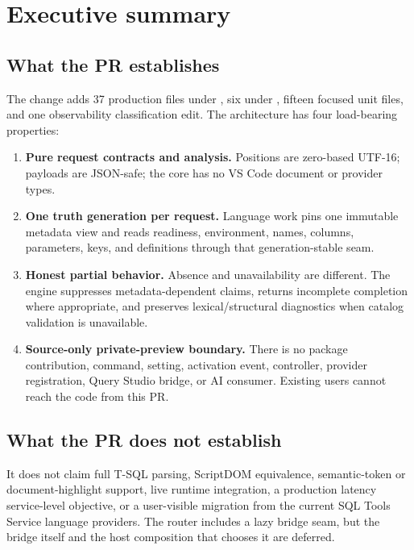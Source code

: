 \documentclass[11pt]{article}
\begin{document}
\section{Executive summary}

\subsection{What the PR establishes}

The change adds 37 production files under , six under , fifteen focused unit files, and one observability classification edit. The architecture has four load-bearing properties:

\begin{enumerate}
  \item \textbf{Pure request contracts and analysis.} Positions are zero-based UTF-16; payloads are JSON-safe; the core has no VS Code document or provider types.
  \item \textbf{One truth generation per request.} Language work pins one immutable metadata view and reads readiness, environment, names, columns, parameters, keys, and definitions through that generation-stable seam.
  \item \textbf{Honest partial behavior.} Absence and unavailability are different. The engine suppresses metadata-dependent claims, returns incomplete completion where appropriate, and preserves lexical/structural diagnostics when catalog validation is unavailable.
  \item \textbf{Source-only private-preview boundary.} There is no package contribution, command, setting, activation event, controller, provider registration, Query Studio bridge, or AI consumer. Existing users cannot reach the code from this PR.
\end{enumerate}

\subsection{What the PR does not establish}

It does not claim full T-SQL parsing, ScriptDOM equivalence, semantic-token or document-highlight support, live runtime integration, a production latency service-level objective, or a user-visible migration from the current SQL Tools Service language providers. The router includes a lazy bridge seam, but the bridge itself and the host composition that chooses it are deferred.
\end{document}
